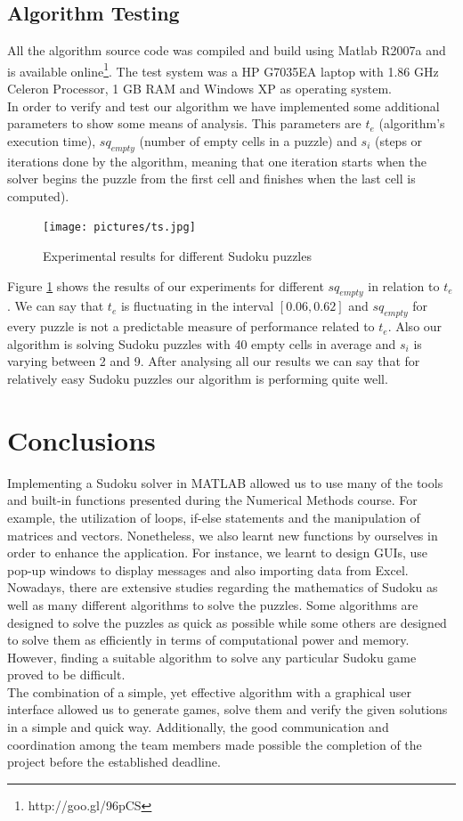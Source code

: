 \documentclass[12pt,a4paper]{article} %
\begin{document}
\subsection{Algorithm Testing}
All the algorithm source code was compiled and build using Matlab R2007a and is available online\footnote{http://goo.gl/96pCS}. The test system was a HP G7035EA laptop with 1.86 GHz Celeron Processor, 1 GB RAM and Windows XP as operating system.
\newline
\\ In order to verify and test our algorithm we have implemented some additional parameters to show some means of analysis. This parameters are $t_e$ (algorithm's execution time), $sq_{empty}$ (number of empty cells in a puzzle) and $s_i$ (steps or iterations done by the algorithm, meaning that one iteration starts when the solver begins the puzzle from the first cell and finishes when the last cell is computed). 
\begin{figure}[h!]
\centering
\texttt{[image: pictures/ts.jpg]}
\caption{Experimental results for different Sudoku puzzles}
\label{fig:ts}
\end{figure}
Figure \ref{fig:ts} shows the results of our experiments for different $sq_{empty}$ in relation to $t_e$. We can say that $t_e$ is fluctuating in the interval $[0.06, 0.62]$ and $sq_{empty}$ for every puzzle is not a predictable measure of performance related to $t_e$. Also our algorithm is solving Sudoku puzzles with 40 empty cells in average and $s_i$ is varying between 2 and 9. After analysing all our results we can say that for relatively easy Sudoku puzzles our algorithm is performing quite well. 
\section{Conclusions}
Implementing a Sudoku solver in MATLAB allowed us to use many of the tools and built-in functions presented during the Numerical Methods course. For example, the utilization of loops, if-else statements and the manipulation of matrices and vectors. Nonetheless, we also learnt new functions by ourselves in order to enhance the application. For instance, we learnt to design GUIs, use pop-up windows to display messages and also importing data from Excel.
\newline
\\Nowadays, there are extensive studies regarding the mathematics of Sudoku as well as many different algorithms to solve the puzzles. Some algorithms are designed to solve the puzzles as quick as possible while some others are designed to solve them as efficiently in terms of computational power and memory. However, finding a suitable algorithm to solve any particular Sudoku game proved to be difficult.
\newline
\\The combination of a simple, yet effective algorithm with a graphical user interface allowed us to generate games, solve them and verify the given solutions in a simple and quick way. Additionally, the good communication and coordination among the team members made possible the completion of the project before the established deadline.

{}

\end{document}
